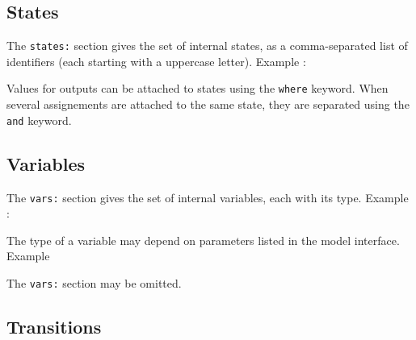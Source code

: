 \begin{center}
\end{center}

\subsection{States}
\label{sec:states}

The \verb|states:| section gives the set of internal states, as a comma-separated list of
identifiers (each starting with a uppercase letter). Example :

\begin{center}
\end{center}

Values for outputs can be attached to states using the \verb|where| keyword. When several
assignements are attached to the same state, they are separated using the \verb|and| keyword.

\begin{center}
\end{center}

\subsection{Variables}
\label{sec:variables}

The \verb|vars:| section gives the set of internal variables, each with its type. Example :

\begin{center}
\end{center}

The type of a variable may depend on parameters listed in the model interface. Example

\begin{center}
\end{center}

The \verb|vars:| section may be omitted.

\subsection{Transitions}
\label{sec:transitions}

